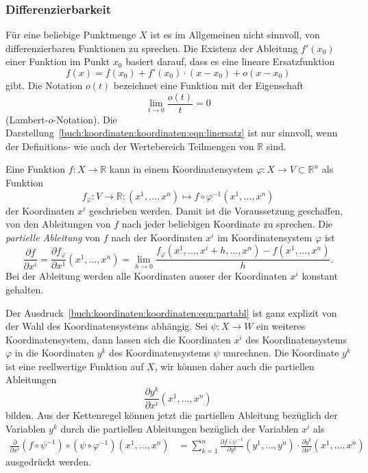 %
%
\subsubsection{Differenzierbarkeit}
Für eine beliebige Punktmenge $X$ ist es im Allgemeinen nicht sinnvoll,
von differenzierbaren Funktionen zu sprechen.
%
Die Existenz der Ableitung $f'(x_0)$ einer Funktion im Punkt $x_0$
basiert darauf, dass es eine lineare Ersatzfunktion
%
\begin{equation}
f(x) = f(x_0) + f'(x_0)\cdot (x-x_0)+o(x-x_0)
\label{buch:koordinaten:koordinaten:eqn:linersatz}
\end{equation}
gibt.
Die Notation $o(t)$ bezeichnet eine Funktion mit der Eigenschaft
\[
\lim_{t\to 0} \frac{o(t)}{t}=0
\]
(Lambert-$o$-Notation).
%
%
Die Darstellung~\eqref{buch:koordinaten:koordinaten:eqn:linersatz}
ist nur sinnvoll, wenn der Definitions- wie auch der Wertebereich
Teilmengen von $\mathbb{R}$ sind.

Eine Funktion $f\colon X\to \mathbb{R}$ kann in einem Koordinatensystem
$\varphi\colon X\to V\subset\mathbb{R}^n$ als Funktion
\[
f_\varphi
\colon
V\to\mathbb{R}
:
(x^1,\dots,x^n)
\mapsto
f\circ\varphi^{-1}(x^1,\dots,x^n)
\]
der Koordinaten $x^i$ geschrieben werden.
Damit ist die Voraussetzung geschaffen, von den Ableitungen von $f$
nach jeder beliebigen Koordinate zu sprechen.
Die {\em partielle Ableitung} von $f$ nach der Koordinaten $x^i$ im
Koordinatensystem $\varphi$ ist
\begin{equation}
\frac{\partial f}{\partial x^i}
=
\frac{\partial f_\varphi}{\partial x^1}(x^1,\dots,x^n)
=
\lim_{h\to 0}
\frac{f_\varphi(x^1,\dots,x^i+h,\dots, x^n)-f(x^1,\dots,x^n)}{h}.
\label{buch:koordinaten:koordinaten:eqn:partabl}
\end{equation}
Bei der Ableitung werden alle Koordinaten ausser der Koordinaten $x^i$
konstant gehalten.

Der Ausdruck~\eqref{buch:koordinaten:koordinaten:eqn:partabl} ist ganz
explizit von der Wahl des Koordinatensystems abhängig.
Sei $\psi\colon X\to W$ ein weiteres Koordinatensystem, dann lassen sich
die Koordinaten $x^i$ des Koordinatensystems $\varphi$ in die 
Koordinaten $y^k$ des Koordinatensystems $\psi$ umrechnen.
Die Koordinate $y^k$ ist eine reellwertige Funktion auf $X$, wir
können daher auch die partiellen Ableitungen
\[
\frac{\partial y^k}{\partial x^i}(x^1,\dots,x^n)
\]
bilden.
Aus der Kettenregel können jetzt die partiellen Ableitung bezüglich
%
der Variablen $y^k$ durch die partiellen Ableitungen bezüglich der
Variablen $x^i$ als
\begin{align*}
\frac{\partial}{\partial x^i}
(f\circ\psi^{-1})\circ (\psi\circ\varphi^{-1})(x^1,\dots,x^n)
&=
\sum_{k=1}^n
\frac{\partial f\circ\psi^{-1}}{\partial y^k}(y^1,\dots,y^n)
\cdot
\frac{\partial y^k}{\partial x^i}(x^1,\dots,x^n)
\end{align*}
ausgedrückt werden.

